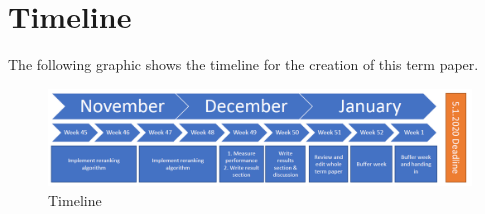 \section{Timeline}
The following graphic shows the timeline for the creation of this term paper.


\begin{figure}[htpb]
    \centering
    \includegraphics[width=\textwidth]{img/timeline.PNG}
    \caption{Timeline}
    \label{fig:timeline}
\end{figure}

